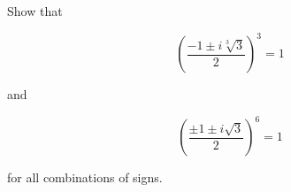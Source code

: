 Show that

$$(\frac{-1\pm i\sqrt[3]{3}}{2})^3=1$$

and

$$(\frac{\pm1\pm i\sqrt{3}}{2})^6=1$$

for all combinations of signs.\\

\begin{solution}\renewcommand{\qedsymbol}{}\ \\

    

\end{solution}